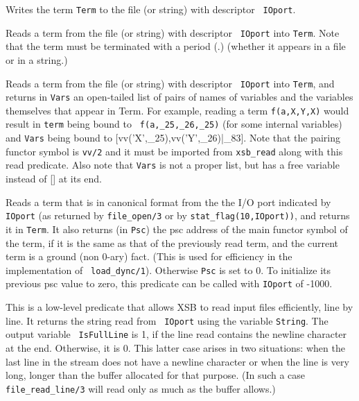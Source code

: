 \begin{description}
    Writes the term {\tt Term} to the file (or string) with descriptor {\tt
    IOport}.

    Reads a term from the file (or string) with descriptor {\tt
    IOport} into {\tt Term}.  Note that the term must be terminated
    with a period (.) (whether it appears in a file or in a string.)

    Reads a term from the file (or string) with descriptor {\tt
    IOport} into {\tt Term}, and returns in {\tt Vars} an open-tailed list of
    pairs of names of variables and the variables themselves that
    appear in Term.  For example, reading a term {\tt f(a,X,Y,X)}
    would result in {\tt term} being bound to {\tt
    f(a,\_25,\_26,\_25)} (for some internal variables) and {\tt Vars}
    being bound to {[vv('X',\_25),vv('Y',\_26)|\_83]}.  Note that the
    pairing functor symbol is {\tt vv/2} and it must be imported from
    {\tt xsb\_read} along with this read predicate.  Also note that 
    {\tt Vars} is not a proper list, but has a free variable instead 
    of [] at its end.

    Reads a term that is in canonical format from the the I/O port
    indicated by {\tt IOport} (as returned by {\tt file\_open/3} or
    by {\tt stat\_flag(10,IOport))}, and returns it in {\tt Term}.
    It also returns (in {\tt Psc}) the psc address of the main functor
    symbol of the term, if it is the same as that of the previously
    read term, and the current term is a ground (non 0-ary) fact.
    (This is used for efficiency in the implementation of {\tt
    load\_dync/1}).  Otherwise {\tt Psc} is set to 0.  To initialize
    its previous psc value to zero, this predicate can be called with
    {\tt IOport} of -1000.

    This is a low-level predicate that allows XSB to read input files
    efficiently, line by line. It returns the string read from {\tt
      IOport} using the variable {\tt String}. The output variable {\tt
      IsFullLine} is 1, if the line read contains the newline character at
    the end. Otherwise, it is 0. This latter case arises in two situations:
    when the last line in the stream does not have a newline  character or
    when the line is very long, longer than the buffer allocated for that
    purpose. (In such a case {\tt file\_read\_line/3} will read only as
    much as the buffer allows.) 


\end{description}
